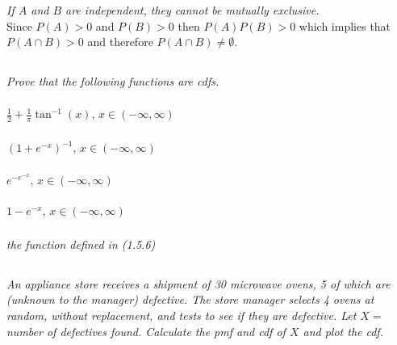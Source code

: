 \documentclass[12pt]{amsart}
\begin{document}
	\subsubsection{} \textit{If \(A\) and \(B\) are independent, they cannot be mutually exclusive.} \\
	
	Since \(P(A) > 0\) and \(P(B) > 0\) then \(P(A)P(B) > 0\) which implies that \(P(A\cap B)>0\)
	and therefore \(P(A\cap B)\neq\emptyset\). \\
	

\setcounter{subsection}{46}
\subsection{} %
\textit{Prove that the following functions are cdfs.}
	\subsubsection{} \( \frac{1}{2}+\frac{1}{\pi} \tan^{-1}(x),\, x\in(-\infty,\infty) \)
	\subsubsection{} \( (1+e^{-x})^{-1},\, x\in(-\infty,\infty) \)
	\subsubsection{} \( e^{-e^{-x}},\, x\in(-\infty,\infty) \)
	\subsubsection{} \( 1-e^{-x},\, x\in(-\infty,\infty) \)
	\subsubsection{} \textit{the function defined in (1.5.6)}

\setcounter{subsection}{50}
\subsection{} %
\textit{An appliance store receives a shipment of 30 microwave ovens, 5 of which are (unknown
	to the manager) defective. The store manager selects 4 ovens at random, without
	replacement, and tests to see if they are defective. Let \(X =\) number of defectives
	found. Calculate the pmf and cdf of \(X\) and plot the cdf.}
\end{document}
